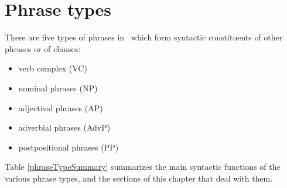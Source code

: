 


\chapter{Phrase types}\label{phraseTypesCh}
There are five types of phrases in \PS\ which form syntactic constituents of other phrases or of clauses: %
\begin{itemize}
\item{verb complex (VC)}
\item{nominal phrases (NP)}
\item{adjectival phrases (AP)}
\item{adverbial phrases (AdvP)}
\item{postpositional phrases (PP)}
\end{itemize}
Table \vref{phraseTypeSummary} summarizes the main syntactic functions of the various phrase types, and the sections of this chapter that deal with them. 
\begin{table}\centering
\caption{Summary of phrase types and their syntactic functions}\label{phraseTypeSummary}
\end{table}


